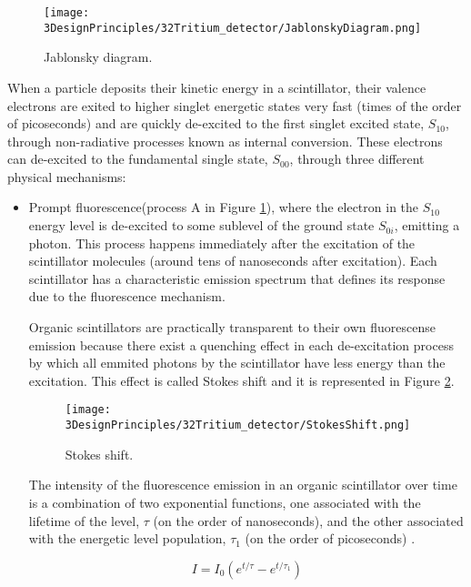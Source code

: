 \begin{figure}[htbp]
\centering
\texttt{[image: 3DesignPrinciples/32Tritium\_detector/JablonskyDiagram.png]}
\caption{Jablonsky diagram.\label{fig:JablonskyDiagram}~\cite{Knoll}}
\end{figure}

When a particle deposits their kinetic energy in a scintillator, their valence electrons are exited to higher singlet energetic states very fast (times of the order of picoseconds) and are quickly de-excited to the first singlet excited state, $S_{10}$, through non-radiative processes known as internal conversion. These electrons can de-excited to the fundamental single state, $S_{00}$, through three different physical mechanisms:

\begin{itemize}

\item{} Prompt fluorescence(process A in Figure \ref{fig:JablonskyDiagram}), where the electron in the $S_{10}$ energy level  is de-excited to some sublevel of the ground state $S_{0i}$, emitting a photon. This process happens immediately after the excitation of the scintillator molecules (around tens of nanoseconds after excitation). Each scintillator has a characteristic emission spectrum that defines its response due to the fluorescence mechanism. 

Organic scintillators are practically transparent to their own fluorescense emission because there exist a quenching effect in each de-excitation process by which all emmited  photons by the scintillator have less energy than the excitation. This effect is called Stokes shift and it is represented in Figure \ref{fig:StokesShift}.

\begin{figure}[htbp]
\centering
\texttt{[image: 3DesignPrinciples/32Tritium\_detector/StokesShift.png]}
\caption{Stokes shift.\label{fig:StokesShift}~\cite{Knoll}}
\end{figure}

The intensity of the fluorescence emission in an organic scintillator over time is a combination of two exponential functions, one associated with the lifetime of the level, $\tau$ (on the order of nanoseconds), and the other associated with the energetic level population, $\tau_1$ (on the order of picoseconds) \cite{Knoll}.

\begin{equation}
I=I_0\left(e^{t/\tau} - e^{t/\tau_1}\right) 
\label{eq:IntensityTimeScintillator}
\end{equation}


\end{itemize}
